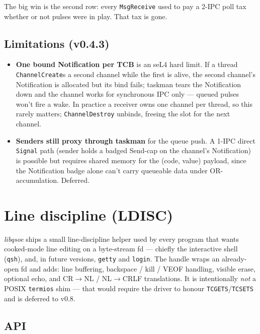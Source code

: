 The big win is the second row: every \texttt{MsgReceive} used to pay
a 2-IPC poll tax whether or not pulses were in play.  That tax is
gone.

\subsection{Limitations (v0.4.3)}

\begin{itemize}
    \item \textbf{One bound Notification per TCB} is an seL4 hard
          limit.  If a thread \texttt{ChannelCreate}s a second channel
          while the first is alive, the second channel's Notification
          is allocated but its bind fails; taskman tears the
          Notification down and the channel works for synchronous
          IPC only --- queued pulses won't fire a wake.  In practice
          a receiver owns one channel per thread, so this rarely
          matters; \texttt{ChannelDestroy} unbinds, freeing the slot
          for the next channel.
    \item \textbf{Senders still proxy through taskman} for the queue
          push.  A 1-IPC direct \texttt{Signal} path (sender holds a
          badged Send-cap on the channel's Notification) is possible
          but requires shared memory for the (code, value) payload,
          since the Notification badge alone can't carry queueable
          data under OR-accumulation.  Deferred.
\end{itemize}

\section{Line discipline (LDISC)}
\label{sec:ldisc}

\emph{libqsoe} ships a small line-discipline helper used by every
program that wants cooked-mode line editing on a byte-stream fd ---
chiefly the interactive shell (\texttt{qsh}), and, in future versions,
\texttt{getty} and \texttt{login}.  The handle wraps an already-open
fd and adds: line buffering, backspace / kill / VEOF handling, visible
erase, optional echo, and CR$\to$NL / NL$\to$CRLF translations.  It is
intentionally \emph{not} a POSIX \texttt{termios} shim --- that would
require the driver to honour \texttt{TCGETS}/\texttt{TCSETS} and is
deferred to v0.8.

\subsection{API}

